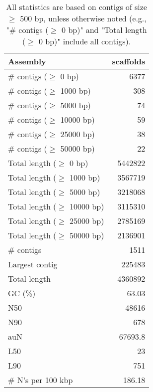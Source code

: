 \documentclass[12pt,a4paper]{article}
\begin{document}
\begin{table}[ht]
\begin{center}
\caption{All statistics are based on contigs of size $\geq$ 500 bp, unless otherwise noted (e.g., "\# contigs ($\geq$ 0 bp)" and "Total length ($\geq$ 0 bp)" include all contigs).}
\begin{tabular}{|l*{1}{|r}|}
\hline
Assembly & scaffolds \\ \hline
\# contigs ($\geq$ 0 bp) & 6377 \\ \hline
\# contigs ($\geq$ 1000 bp) & 308 \\ \hline
\# contigs ($\geq$ 5000 bp) & 74 \\ \hline
\# contigs ($\geq$ 10000 bp) & 59 \\ \hline
\# contigs ($\geq$ 25000 bp) & 38 \\ \hline
\# contigs ($\geq$ 50000 bp) & 22 \\ \hline
Total length ($\geq$ 0 bp) & 5442822 \\ \hline
Total length ($\geq$ 1000 bp) & 3567719 \\ \hline
Total length ($\geq$ 5000 bp) & 3218068 \\ \hline
Total length ($\geq$ 10000 bp) & 3115310 \\ \hline
Total length ($\geq$ 25000 bp) & 2785169 \\ \hline
Total length ($\geq$ 50000 bp) & 2136901 \\ \hline
\# contigs & 1511 \\ \hline
Largest contig & 225483 \\ \hline
Total length & 4360892 \\ \hline
GC (\%) & 63.03 \\ \hline
N50 & 48616 \\ \hline
N90 & 678 \\ \hline
auN & 67693.8 \\ \hline
L50 & 23 \\ \hline
L90 & 751 \\ \hline
\# N's per 100 kbp & 186.18 \\ \hline
\end{tabular}
\end{center}
\end{table}
\end{document}
